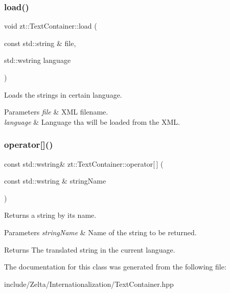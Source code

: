 \subsubsection{\texorpdfstring{load()}{load()}}
{\footnotesize\ttfamily void zt\+::\+Text\+Container\+::load (\begin{DoxyParamCaption}\item[{const std\+::string \&}]{file,  }\item[{std\+::wstring}]{language }\end{DoxyParamCaption})}



Loads the strings in certain language. 


\begin{DoxyParams}{Parameters}
{\em file} & X\+ML filename. \\
\hline
{\em language} & Language tha will be loaded from the X\+ML. \\
\hline
\end{DoxyParams}
\mbox{\label{classzt_1_1_text_container_ada6e7f11402ab289e02bec50633cd45d}} 
\subsubsection{\texorpdfstring{operator[]()}{operator[]()}}
{\footnotesize\ttfamily const std\+::wstring\& zt\+::\+Text\+Container\+::operator\mbox{[}$\,$\mbox{]} (\begin{DoxyParamCaption}\item[{const std\+::wstring \&}]{string\+Name }\end{DoxyParamCaption})}



Returns a string by its name. 


\begin{DoxyParams}{Parameters}
{\em string\+Name} & Name of the string to be returned. \\
\hline
\end{DoxyParams}
\begin{DoxyReturn}{Returns}
The translated string in the current language. 
\end{DoxyReturn}


The documentation for this class was generated from the following file\+:\begin{DoxyCompactItemize}
\item 
include/\+Zelta/\+Internationalization/Text\+Container.\+hpp\end{DoxyCompactItemize}
